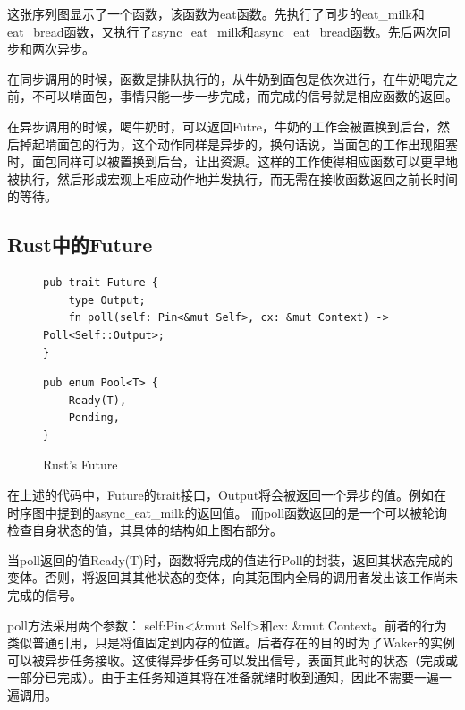 这张序列图显示了一个函数，该函数为eat函数。先执行了同步的eat\_milk和eat\_bread函数，又执行了async\_eat\_milk和async\_eat\_bread函数。先后两次同步和两次异步。


在同步调用的时候，函数是排队执行的，从牛奶到面包是依次进行，在牛奶喝完之前，不可以啃面包，事情只能一步一步完成，而完成的信号就是相应函数的返回。


在异步调用的时候，喝牛奶时，可以返回Futre，牛奶的工作会被置换到后台，然后掉起啃面包的行为，这个动作同样是异步的，换句话说，当面包的工作出现阻塞时，面包同样可以被置换到后台，让出资源。这样的工作使得相应函数可以更早地被执行，然后形成宏观上相应动作地并发执行，而无需在接收函数返回之前长时间的等待。

\subsection{Rust中的Future}

\begin{figure}[htbp]
    \figureCapSet
	\centering
	\begin{minipage}{0.49\linewidth}%
		\centering
\begin{lstlisting}[frame=none]
pub trait Future {
    type Output;
    fn poll(self: Pin<&mut Self>, cx: &mut Context) -> Poll<Self::Output>;
}
\end{lstlisting}
	\end{minipage}
    \hfill
	\begin{minipage}{0.49\linewidth}
		\centering
        \begin{lstlisting}[frame=none]
pub enum Pool<T> {
    Ready(T),
    Pending,
}
        \end{lstlisting}
	\end{minipage}
    \caption{Rust's Future}
\end{figure}

在上述的代码中，Future的trait接口，Output将会被返回一个异步的值。例如在时序图中提到的async\_eat\_milk的返回值。 而poll函数返回的是一个可以被轮询检查自身状态的值，其具体的结构如上图右部分。 

当poll返回的值Ready(T)时，函数将完成的值进行Poll的封装，返回其状态完成的变体。否则，将返回其其他状态的变体，向其范围内全局的调用者发出该工作尚未完成的信号。

poll方法采用两个参数： self:Pin<\&mut Self>和cx: \&mut Context。前者的行为类似普通引用，只是将值固定到内存的位置。后者存在的目的时为了Waker的实例可以被异步任务接收。这使得异步任务可以发出信号，表面其此时的状态（完成或一部分已完成）。由于主任务知道其将在准备就绪时收到通知，因此不需要一遍一遍调用。

